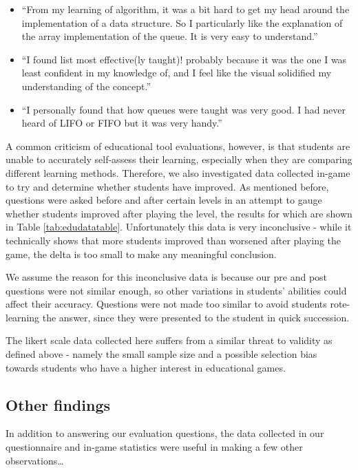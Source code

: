\documentclass[11pt]{article}
\begin{document}
\begin{spacing}{1.5}
\begin{itemize}
  \item ``From my learning of algorithm, it was a bit hard to get my head around the implementation of a data structure. So I particularly like the explanation of the array implementation of the queue. It is very easy to understand.''
  \item ``I found list most effective(ly taught)! probably because it was the one I was least confident in my knowledge of, and I feel like the visual solidified my understanding of the concept.''
  \item ``I personally found that how queues were taught was very good. I had never heard of LIFO or FIFO but it was very handy.''
\end{itemize}
\end{spacing}
A common criticism of educational tool evaluations, however, is that students are unable to accurately self-assess their learning, especially when they are comparing different learning methods. Therefore, we also investigated data collected in-game to try and determine whether students have improved. As mentioned before, questions were asked before and after certain levels in an attempt to gauge whether students improved after playing the level, the results for which are shown in Table \ref{tab:edudatatable}. Unfortunately this data is very inconclusive - while it technically shows that more students improved than worsened after playing the game, the delta is too small to make any meaningful conclusion.\par
We assume the reason for this inconclusive data is because our pre and post questions were not similar enough, so other variations in students' abilities could affect their accuracy. Questions were not made too similar to avoid students rote-learning the answer, since they were presented to the student in quick succession.\par
The likert scale data collected here suffers from a similar threat to validity as defined above - namely the small sample size and a possible selection bias towards students who have a higher interest in educational games.
\subsection{Other findings}
In addition to answering our evaluation questions, the data collected in our questionnaire and in-game statistics were useful in making a few other observations\dots
\end{document}
